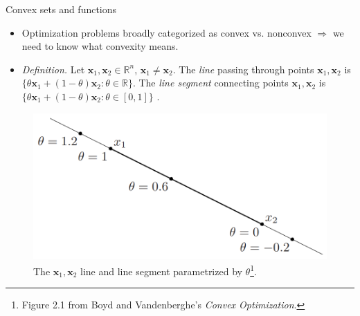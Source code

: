 \documentclass{beamer}
\numberwithin{equation}{section}
\begin{document}
\begin{frame}{Convex sets and functions}
    \begin{itemize}
        \item
        Optimization problems broadly categorized as convex vs. nonconvex
        $ \Rightarrow $ we need to know what convexity means.

        \item
        \textit{Definition.} Let $ \mathbf{x}_1, \mathbf{x}_2 \in
        \mathbb{R}^n $, $ \mathbf{x}_1 \ne \mathbf{x}_2 $. The \textit{line}
        passing through points $ \mathbf{x}_1, \mathbf{x}_2 $ is
        $ \{\theta\mathbf{x}_1 + (1 - \theta)\mathbf{x}_2 :
        \theta \in \mathbb{R}\} $. The \textit{line segment} connecting
        points $ \mathbf{x}_1, \mathbf{x}_2 $ is $ \{\theta\mathbf{x}_1 +
        (1 - \theta) \mathbf{x}_2 : \theta \in [0, 1]\} $
        \cite{bv_convex_opt}.
    \end{itemize}
    \begin{figure}
        \centering
        \includegraphics[scale = 0.3]{bv_fig_2.1.png}
        \vspace{-10 pt}
        \caption{
            The $ \mathbf{x}_1, \mathbf{x}_2 $ line and line segment
            parametrized by $ \theta $\footnote{
                Figure 2.1 from Boyd and Vandenberghe's
                \textit{Convex Optimization}.
            }.
        }
    \end{figure}
\end{frame}
\end{document}
